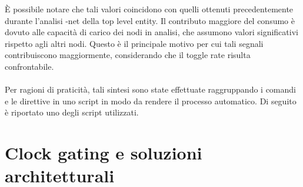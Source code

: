 \documentclass[11pt,  english, makeidx, a4paper, titlepage, oneside]{book}
\newenvironment{listato}{\footnotesize} {\normalsize }
\begin{document}
\vspace{0.3cm}
È possibile notare che tali valori coincidono con quelli ottenuti precedentemente durante l'analisi -net della top level entity. Il contributo maggiore del consumo è dovuto alle capacità di carico dei nodi in analisi, che assumono  valori significativi rispetto agli altri nodi. Questo è il principale motivo per cui tali segnali contribuiscono maggiormente, considerando che il toggle rate risulta confrontabile.
\\\\
Per ragioni di praticità, tali sintesi sono state effettuate raggruppando i comandi e le direttive in uno script in modo da rendere il processo automatico. Di seguito è riportato uno degli script utilizzati.
\begin{center}
\begin{listato}
	\centerline{}
\end{listato}
\end{center}

\chapter{Clock gating e soluzioni architetturali}
\end{document}
